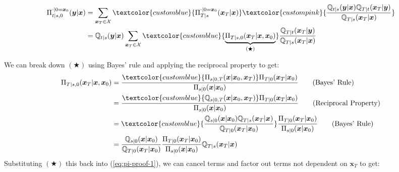 \documentclass{article}
\newcommand{\bluetext}[1]{\textcolor{customblue}{#1}}
\newcommand{\pinktext}[1]{\textcolor{custompink}{#1}}
\begin{document}
\begin{small}
\begin{align}
    \Pi^{\cdot|0=\boldsymbol{x}_0}_{t|s, 0}(\boldsymbol{y}|\boldsymbol{x})&=\sum_{\boldsymbol{x}_T\in \mathcal{X}}\bluetext{\Pi_{T|s}^{\cdot|0=\boldsymbol{x}_0}(\boldsymbol{x}_T|\boldsymbol{x})}\pinktext{\frac{\mathbb{Q}_{t|s}(\boldsymbol{y}|\boldsymbol{x})\mathbb{Q}_{T|t}(\boldsymbol{x}_T|\boldsymbol{y})}{\mathbb{Q}_{T|s}(\boldsymbol{x}_T|\boldsymbol{x})}}\nonumber\\
    &=\mathbb{Q}_{t|s}(\boldsymbol{y}|\boldsymbol{x})\sum_{\boldsymbol{x}_T\in \mathcal{X}}\bluetext{\underbrace{\Pi_{T|s,0}(\boldsymbol{x}_T|\boldsymbol{x}, \boldsymbol{x}_0)}_{(\bigstar)}}\frac{\mathbb{Q}_{T|t}(\boldsymbol{x}_T|\boldsymbol{y})}{\mathbb{Q}_{T|s}(\boldsymbol{x}_T|\boldsymbol{x})}\label{eq:pi-proof-1}
\end{align}
\end{small}
We can break down $(\bigstar)$ using Bayes' rule and applying the reciprocal property to get:
\begin{align}
    \Pi_{T|s,0}(\boldsymbol{x}_T|\boldsymbol{x},\boldsymbol{x}_0)&=\frac{\bluetext{\Pi_{s|0,T}(\boldsymbol{x}|\boldsymbol{x}_0, \boldsymbol{x}_T)}\Pi_{T|0}(\boldsymbol{x}_T|\boldsymbol{x}_0)}{\Pi_{s|0}(\boldsymbol{x}|\boldsymbol{x}_0)}\tag{Bayes' Rule}\\
    &=\frac{\bluetext{\mathbb{Q}_{s|0,T}(\boldsymbol{x}|\boldsymbol{x}_0, \boldsymbol{x}_T)}\Pi_{T|0}(\boldsymbol{x}_T|\boldsymbol{x}_0)}{\Pi_{s|0}(\boldsymbol{x}|\boldsymbol{x}_0)}\tag{Reciprocal Property}\\
    &=\bluetext{\frac{\mathbb{Q}_{s|0}(\boldsymbol{x}|\boldsymbol{x}_0)\mathbb{Q}_{T|s}(\boldsymbol{x}_T|\boldsymbol{x})}{\mathbb{Q}_{T|0}(\boldsymbol{x}_T|\boldsymbol{x}_0)}}\frac{\Pi_{T|0}(\boldsymbol{x}_T|\boldsymbol{x}_0)}{\Pi_{s|0}(\boldsymbol{x}|\boldsymbol{x}_0)}\tag{Bayes' Rule}\\
    &=\frac{\mathbb{Q}_{s|0}(\boldsymbol{x}|\boldsymbol{x}_0)}{\mathbb{Q}_{T|0}(\boldsymbol{x}_T|\boldsymbol{x}_0)}\frac{\Pi_{T|0}(\boldsymbol{x}_T|\boldsymbol{x}_0)}{\Pi_{s|0}(\boldsymbol{x}|\boldsymbol{x}_0)}\mathbb{Q}_{T|s}(\boldsymbol{x}_T|\boldsymbol{x})
\end{align}
Substituting $(\bigstar)$ this back into (\ref{eq:pi-proof-1}), we can cancel terms and factor out terms not dependent on $\boldsymbol{x}_T$ to get: 
\end{document}
